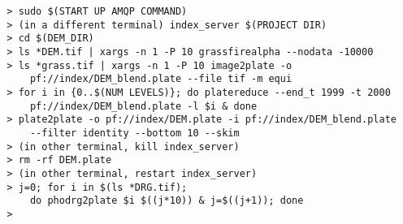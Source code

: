 \begin{verbatim}
  > sudo $(START UP AMQP COMMAND)
  > (in a different terminal) index_server $(PROJECT DIR)
  > cd $(DEM_DIR)
  > ls *DEM.tif | xargs -n 1 -P 10 grassfirealpha --nodata -10000
  > ls *grass.tif | xargs -n 1 -P 10 image2plate -o
      pf://index/DEM_blend.plate --file tif -m equi
  > for i in {0..$(NUM LEVELS)}; do platereduce --end_t 1999 -t 2000
      pf://index/DEM_blend.plate -l $i & done
  > plate2plate -o pf://index/DEM.plate -i pf://index/DEM_blend.plate
      --filter identity --bottom 10 --skim
  > (in other terminal, kill index_server)
  > rm -rf DEM.plate
  > (in other terminal, restart index_server)
  > j=0; for i in $(ls *DRG.tif);
      do phodrg2plate $i $((j*10)) & j=$((j+1)); done
  >
\end{verbatim}
